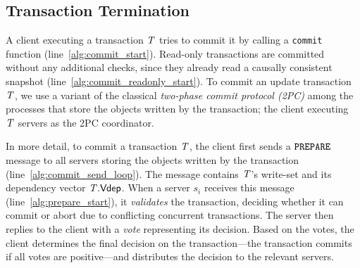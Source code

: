 \subsection{Transaction Termination}

A client executing a transaction $\mathit{T}$ tries to commit it by calling a {\tt commit} function (line~\ref{alg:commit_start}). Read-only transactions are committed without any additional checks, since they already read a causally consistent snapshot (line~\ref{alg:commit_readonly_start}). To commit an update transaction $\mathit{T}$, we use a variant of the classical \emph{two-phase commit protocol (2PC)} among the processes that store the objects written by the transaction; the client executing $\mathit{T}$ servers as the 2PC coordinator.

In more detail, to commit a transaction $\mathit{T}$, the client first sends a ${\tt PREPARE}$ message to all servers storing the objects written by the transaction (line~\ref{alg:commit_send_loop}). The message contains $\mathit{T}$'s write-set and its dependency vector $\mathit{T}.\mathsf{Vdep}$. When a server $s_i$ receives this message (line~\ref{alg:prepare_start}), it \emph{validates} the transaction, deciding whether it can commit or abort due to conflicting concurrent transactions. The server then replies to the client with a \emph{vote} representing its decision. Based on the votes, the client determines the final decision on the transaction---the transaction commits if all votes are positive---and distributes the decision to the relevant servers.

